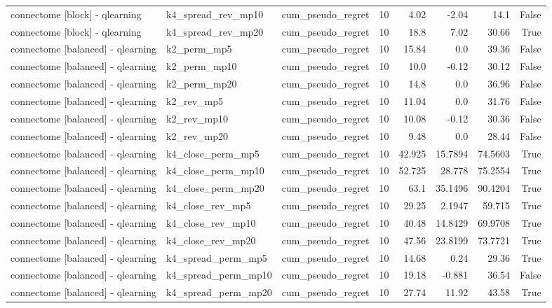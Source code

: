 \begin{table}[t]
\begin{tabular}{lllrrrrr}
connectome [block] - qlearning & k4\_spread\_rev\_mp10 & cum\_pseudo\_regret & 10 & 4.02 & -2.04 & 14.1 & False \\
connectome [block] - qlearning & k4\_spread\_rev\_mp20 & cum\_pseudo\_regret & 10 & 18.8 & 7.02 & 30.66 & True \\
connectome [balanced] - qlearning & k2\_perm\_mp5 & cum\_pseudo\_regret & 10 & 15.84 & 0.0 & 39.36 & False \\
connectome [balanced] - qlearning & k2\_perm\_mp10 & cum\_pseudo\_regret & 10 & 10.0 & -0.12 & 30.12 & False \\
connectome [balanced] - qlearning & k2\_perm\_mp20 & cum\_pseudo\_regret & 10 & 14.8 & 0.0 & 36.96 & False \\
connectome [balanced] - qlearning & k2\_rev\_mp5 & cum\_pseudo\_regret & 10 & 11.04 & 0.0 & 31.76 & False \\
connectome [balanced] - qlearning & k2\_rev\_mp10 & cum\_pseudo\_regret & 10 & 10.08 & -0.12 & 30.36 & False \\
connectome [balanced] - qlearning & k2\_rev\_mp20 & cum\_pseudo\_regret & 10 & 9.48 & 0.0 & 28.44 & False \\
connectome [balanced] - qlearning & k4\_close\_perm\_mp5 & cum\_pseudo\_regret & 10 & 42.925 & 15.7894 & 74.5603 & True \\
connectome [balanced] - qlearning & k4\_close\_perm\_mp10 & cum\_pseudo\_regret & 10 & 52.725 & 28.778 & 75.2554 & True \\
connectome [balanced] - qlearning & k4\_close\_perm\_mp20 & cum\_pseudo\_regret & 10 & 63.1 & 35.1496 & 90.4204 & True \\
connectome [balanced] - qlearning & k4\_close\_rev\_mp5 & cum\_pseudo\_regret & 10 & 29.25 & 2.1947 & 59.715 & True \\
connectome [balanced] - qlearning & k4\_close\_rev\_mp10 & cum\_pseudo\_regret & 10 & 40.48 & 14.8429 & 69.9708 & True \\
connectome [balanced] - qlearning & k4\_close\_rev\_mp20 & cum\_pseudo\_regret & 10 & 47.56 & 23.8199 & 73.7721 & True \\
connectome [balanced] - qlearning & k4\_spread\_perm\_mp5 & cum\_pseudo\_regret & 10 & 14.68 & 0.24 & 29.36 & True \\
connectome [balanced] - qlearning & k4\_spread\_perm\_mp10 & cum\_pseudo\_regret & 10 & 19.18 & -0.881 & 36.54 & False \\
connectome [balanced] - qlearning & k4\_spread\_perm\_mp20 & cum\_pseudo\_regret & 10 & 27.74 & 11.92 & 43.58 & True \\

\end{tabular}
\end{table}
